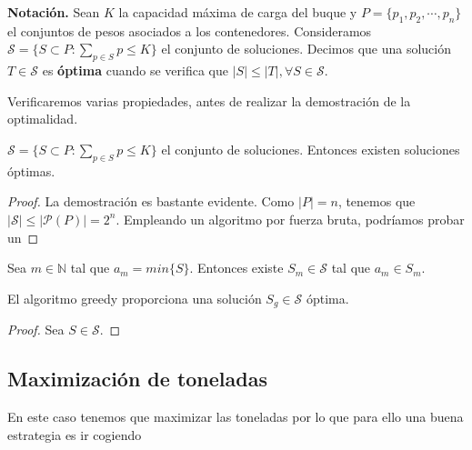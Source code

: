 \textbf{Notación.} Sean $K$ la capacidad máxima de carga del buque y
$P = \{p_1,p_2,\cdots,p_n\}$ el conjuntos de pesos asociados
a los contenedores. Consideramos $\mathcal{S} = \{S \subset P : 
\sum_{p \in S} p \leq K\}$ el conjunto de soluciones. Decimos que una solución
$T \in \mathcal{S}$ es \textbf{óptima} cuando se verifica que $|S| \leq |T|,
\forall S \in \mathcal{S}$.

Verificaremos varias propiedades, antes de realizar la demostración de la optimalidad.

\begin{lemma}
    $\mathcal{S} = \{S \subset P : \sum_{p \in S} p \leq K\}$ el conjunto de soluciones. Entonces
    existen soluciones óptimas.
\end{lemma}

\begin{proof}
    La demostración es bastante evidente. Como $|P| = n$, tenemos que $|\mathcal S| \leq |\mathcal P (P)| = 2^n$. 
    Empleando un algoritmo por fuerza bruta, podríamos probar un 
\end{proof}

\begin{lemma}
    Sea $m \in \mathbb N$ tal que $a_{m} = min\{S\}$. Entonces existe $S_m \in \mathcal S$ tal que
    $a_m \in S_m$. 
\end{lemma}

\begin{proposition}
    El algoritmo greedy proporciona una solución $S_{g} \in \mathcal{S}$ óptima. 
\end{proposition}

\begin{proof}
    Sea $S \in \mathcal{S}$. 
\end{proof}

\subsection{Maximización de toneladas}
En este caso tenemos que maximizar las toneladas por lo que para ello una buena estrategia es ir cogiendo 
